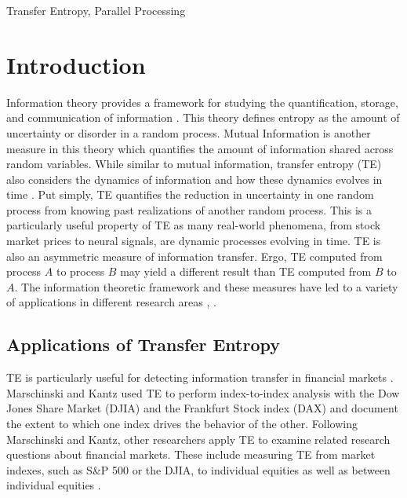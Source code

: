 \documentclass[conference]{IEEEtran}
\begin{document}
\begin{IEEEkeywords}
Transfer Entropy, Parallel Processing
\end{IEEEkeywords}

\section{Introduction}

Information theory provides a framework for studying the quantification, storage, and communication of information \cite{InfoTheoryApplications}.  This theory defines entropy as the amount of uncertainty or disorder in a random process. Mutual Information is another measure in this theory which quantifies the amount of information shared across random variables. While similar to mutual information, transfer entropy (TE) also considers the dynamics of information and how these dynamics evolves in time \cite{IntroToTransferEntropy}. Put simply, TE quantifies the reduction in uncertainty in one random process from knowing past realizations of another random process. This is a particularly useful property of TE as many real-world phenomena, from stock market prices to neural signals, are dynamic processes evolving in time. TE is also an asymmetric measure of information transfer. Ergo, TE computed from process \(A\) to process \(B\) may yield a different result than TE computed from \(B\) to \(A\). The information theoretic framework and these measures have led to a variety of applications in different research areas \cite{InfoTheoryApplications}, \cite{TEBook}.


\subsection{Applications of Transfer Entropy}

TE is particularly useful for detecting information transfer in financial markets \cite{TEBook}. Marschinski and Kantz used TE to perform index-to-index analysis with the Dow Jones Share Market (DJIA) and the Frankfurt Stock index (DAX) \cite{FinAppTE} and document the extent to which one index drives the behavior of the other. Following Marschinski and Kantz, other researchers apply TE to examine related research questions about financial markets. These include measuring TE from market indexes, such as S\&P 500 or the DJIA, to individual equities as well as between individual equities \cite{TEBook}.
\end{document}
